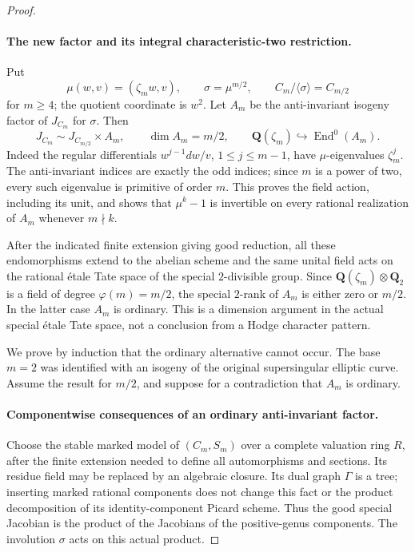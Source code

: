 \begin{proof}
\paragraph{The new factor and its integral characteristic-two restriction.}
Put
\[
 \mu(w,v)=(\zeta_mw,v),\qquad
 \sigma=\mu^{m/2},\qquad C_m/\langle\sigma\rangle=C_{m/2}
                                                        \tag{A.69.4}
\]
for \(m\ge4\); the quotient coordinate is \(w^2\).
Let \(A_m\) be the anti-invariant isogeny factor of \(J_{C_m}\)
for \(\sigma\). Then
\[
 J_{C_m}\sim J_{C_{m/2}}\times A_m,\qquad
 \dim A_m=m/2,
 \qquad \mathbf Q(\zeta_m)\hookrightarrow\operatorname{End}^0(A_m).
                                                        \tag{A.69.5}
\]
Indeed the regular differentials \(w^{j-1}dw/v\),
\(1\le j\le m-1\), have \(\mu\)-eigenvalues \(\zeta_m^j\).
The anti-invariant indices are exactly the odd indices; since \(m\)
is a power of two, every such eigenvalue is primitive of order
\(m\). This proves the field action, including its unit, and shows
that \(\mu^k-1\) is invertible on every rational realization of
\(A_m\) whenever \(m\nmid k\).

After the indicated finite extension giving good reduction, all
these endomorphisms extend to the abelian scheme and the same
unital field acts on the rational \'{e}tale Tate space of the special
\(2\)-divisible group. Since
\(\mathbf Q(\zeta_m)\otimes\mathbf Q_2\) is a field of degree
\(\varphi(m)=m/2\), the special \(2\)-rank of \(A_m\) is either
zero or \(m/2\). In the latter case \(A_m\) is ordinary.
This is a dimension argument in the actual special \'{e}tale Tate
space, not a conclusion from a Hodge character pattern.

We prove by induction that the ordinary alternative cannot occur.
The base \(m=2\) was identified with an isogeny of the original
supersingular elliptic curve. Assume the result for \(m/2\), and
suppose for a contradiction that \(A_m\) is ordinary.

\paragraph{Componentwise consequences of an ordinary anti-invariant factor.}
Choose the stable marked model of \((C_m,S_m)\) over a complete
valuation ring \(R\), after the finite extension needed to define
all automorphisms and sections. Its residue field may be replaced
by an algebraic closure. Its dual graph \(\Gamma\) is a tree;
inserting marked rational components does not change this fact or
the product decomposition of its identity-component Picard scheme.
Thus the good special Jacobian is the product of the Jacobians of
the positive-genus components. The involution \(\sigma\) acts on
this actual product.


\end{proof}
